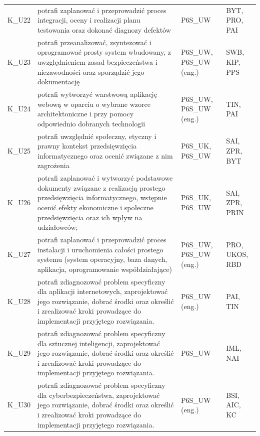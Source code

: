 \documentclass[12pt,a4paper]{article}
\begin{document}
{\begin{longtable}{m{1cm}m{8.8cm}m{2.1cm}m{2.5cm}}
\rowcolor{tableRowAlt} K\_U22 & potrafi zaplanować i przeprowadzić proces integracji, oceny i realizacji planu testowania oraz dokonać diagnozy defektów & {\scriptsize P6S\_UW} & {\scriptsize BYT, PRO, PAI} \\
\rowcolor{tableRowLight} K\_U23 & potrafi przeanalizować, zsyntezować i oprogramować prosty system wbudowany, z uwzględnieniem zasad bezpieczeństwa i niezawodności oraz sporządzić jego dokumentację & {\scriptsize P6S\_UW, P6S\_UW {\scriptsize (eng.)}} & {\scriptsize SWB, KIP, PPS} \\
\rowcolor{tableRowAlt} K\_U24 & potrafi wytworzyć warstwową aplikację webową w oparciu o wybrane wzorce architektoniczne i przy pomocy odpowiednio dobranych technologii & {\scriptsize P6S\_UW, P6S\_UW {\scriptsize (eng.)}} & {\scriptsize TIN, PAI} \\
\rowcolor{tableRowLight} K\_U25 & potrafi uwzględnić społeczny, etyczny i prawny kontekst przedsięwzięcia informatycznego oraz ocenić związane z nim zagrożenia & {\scriptsize P6S\_UK, P6S\_UW} & {\scriptsize SAI, ZPR, BYT} \\
\rowcolor{tableRowAlt} K\_U26 & potrafi zaplanować i wytworzyć podstawowe dokumenty związane z realizacją prostego przedsięwzięcia informatycznego, wstępnie ocenić efekty ekonomiczne i społeczne przedsięwzięcia oraz ich wpływ na udziałowców; & {\scriptsize P6S\_UK, P6S\_UW} & {\scriptsize SAI, ZPR, PRIN} \\
\rowcolor{tableRowLight} K\_U27 & potrafi zaplanować i przeprowadzić proces instalacji i uruchomienia całości prostego systemu (system operacyjny, baza danych, aplikacja, oprogramowanie współdziałające) & {\scriptsize P6S\_UW, P6S\_UW {\scriptsize (eng.)}} & {\scriptsize PRO, UKOS, RBD} \\
\rowcolor{tableRowAlt} K\_U28 & potrafi zdiagnozować problem specyficzny dla aplikacji internetowych, zaprojektować jego rozwiązanie, dobrać środki oraz określić i zrealizować kroki prowadzące do implementacji przyjętego rozwiązania. & {\scriptsize P6S\_UW {\scriptsize (eng.)}} & {\scriptsize PAI, TIN} \\
\rowcolor{tableRowLight} K\_U29 & potrafi zdiagnozować problem specyficzny dla sztucznej inteligencji, zaprojektować jego rozwiązanie, dobrać środki oraz określić i zrealizować kroki prowadzące do implementacji przyjętego rozwiązania. & {\scriptsize P6S\_UW} & {\scriptsize IML, NAI} \\
\rowcolor{tableRowAlt} K\_U30 & potrafi zdiagnozować problem specyficzny dla cyberbezpieczeństwa, zaprojektować jego rozwiązanie, dobrać środki oraz określić i zrealizować kroki prowadzące do implementacji przyjętego rozwiązania. & {\scriptsize P6S\_UW {\scriptsize (eng.)}} & {\scriptsize BSI, AIC, KC} \\

\end{longtable}}
\end{document}
